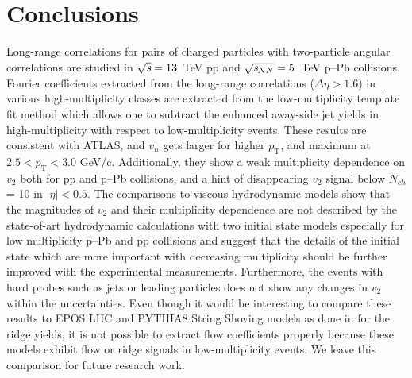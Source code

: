 
\section{Conclusions}
\label{sec:summary}
Long-range correlations for pairs of charged particles with two-particle angular correlations are studied in ${\sqrt{{\textit s}}}=13$~TeV pp and ${\sqrt{{\textit s_{NN}}}}=5$~TeV p--Pb collisions. Fourier coefficients extracted from the long-range correlations ($\Delta\eta > 1.6$) in various high-multiplicity classes are extracted from the low-multiplicity template fit method which allows one to subtract the enhanced away-side jet yields in high-multiplicity with respect to low-multiplicity events.
These results are consistent with ATLAS, and $v_n$ gets larger for higher $p_\mathrm{T}$, and maximum at $2.5<p_\mathrm{T}<3.0$ GeV/c. 
Additionally, they show a weak multiplicity dependence on $v_2$ both for pp and p--Pb collisions, and a hint of disappearing $v_2$ signal below $N_{ch}$ = 10 in $|\eta|<0.5$. 
The comparisons to viscous hydrodynamic models show that the magnitudes of $v_2$ and their multiplicity dependence are not described by the state-of-art hydrodynamic calculations with two initial state models especially for low multiplicity p--Pb and pp collisions and suggest that the details of the initial state which are more important with decreasing multiplicity should be further improved with the experimental measurements. 
Furthermore, the events with hard probes such as jets or leading particles does not show any changes in $v_2$ within the uncertainties. 
Even though it would be interesting to compare these results to EPOS LHC and PYTHIA8 String Shoving models as done in \cite{ALICE:2012eyl} for the ridge yields, it is not possible to extract flow coefficients properly because these models exhibit flow or ridge signals in low-multiplicity events. We leave this comparison for future research work.

